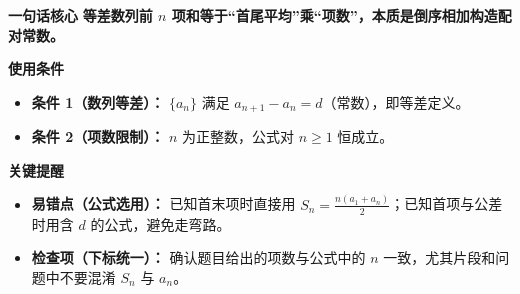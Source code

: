 \begin{summarybox}
\textbf{\textcolor{CSummary}{一句话核心}}
\textbf{等差数列前 $n$ 项和等于“首尾平均”乘“项数”，本质是倒序相加构造配对常数。}

\medskip
\textbf{\textcolor{CSummary}{使用条件}}
\begin{itemize}[leftmargin=*, itemsep=0.5em, topsep=0.4em]
    \item \textbf{条件 1（数列等差）：} $\{a_n\}$ 满足 $a_{n+1}-a_n=d$（常数），即等差定义。
    \item \textbf{条件 2（项数限制）：} $n$ 为正整数，公式对 $n\geq 1$ 恒成立。
\end{itemize}

\medskip
\textbf{\textcolor{CSummary}{关键提醒}}
\begin{itemize}[leftmargin=*, itemsep=0.5em, topsep=0.4em]
    \item \textbf{易错点（公式选用）：} 已知首末项时直接用 $S_n = \frac{n(a_1+a_n)}{2}$；已知首项与公差时用含 $d$ 的公式，避免走弯路。
    \item \textbf{检查项（下标统一）：} 确认题目给出的项数与公式中的 $n$ 一致，尤其片段和问题中不要混淆 $S_n$ 与 $a_n$。
\end{itemize}
\end{summarybox}
